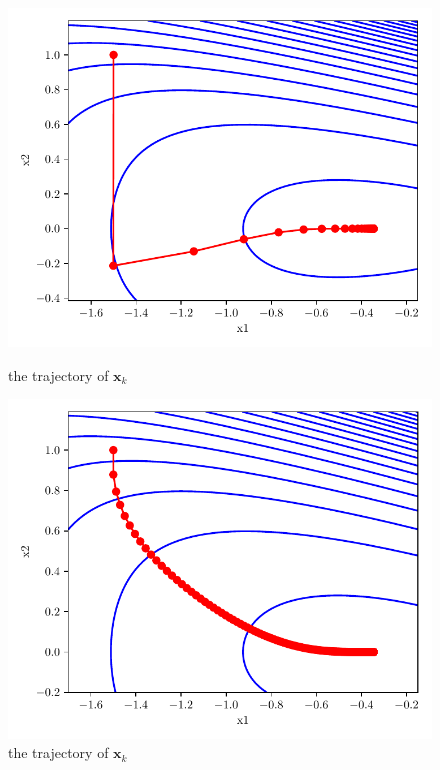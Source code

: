 \documentclass{article}
\def\bx{\boldsymbol{x}}
\begin{document}
\begin{enumerate}[(a)]
\begin{figure}[h]
\begin{minipage}[b]{0.46\linewidth}
				\includegraphics[width=1\linewidth]
				{p1bc/gd_traces_css0.1.pdf}
				\caption*{the trajectory of $\bx_k$}
				\includegraphics[width=1\linewidth]
				{p1bc/gd_traces_css0.01.pdf}
				\caption*{the trajectory of $\bx_k$}
			\end{minipage}
		\end{figure}


\end{enumerate}
\end{document}
